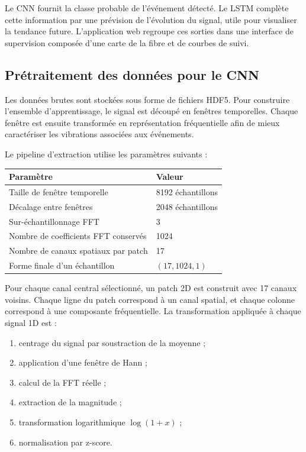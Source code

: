 \documentclass[10pt,a4paper]{article}
\begin{document}
Le CNN fournit la classe probable de l'événement détecté. Le LSTM complète cette information par une
prévision de l'évolution du signal, utile pour visualiser la tendance future. L'application web regroupe
ces sorties dans une interface de supervision composée d'une carte de la fibre et de courbes de suivi.

\subsection{Prétraitement des données pour le CNN}

Les données brutes sont stockées sous forme de fichiers HDF5. Pour construire l'ensemble d'apprentissage,
le signal est découpé en fenêtres temporelles. Chaque fenêtre est ensuite transformée en représentation
fréquentielle afin de mieux caractériser les vibrations associées aux événements.

Le pipeline d'extraction utilise les paramètres suivants :

\begin{center}
\begin{tabular}{ll}
\toprule
\textbf{Paramètre} & \textbf{Valeur} \\
\midrule
Taille de fenêtre temporelle & 8192 échantillons \\
Décalage entre fenêtres & 2048 échantillons \\
Sur-échantillonnage FFT & 3 \\
Nombre de coefficients FFT conservés & 1024 \\
Nombre de canaux spatiaux par patch & 17 \\
Forme finale d'un échantillon & $(17, 1024, 1)$ \\
\bottomrule
\end{tabular}
\end{center}

Pour chaque canal central sélectionné, un patch 2D est construit avec 17 canaux voisins. Chaque ligne du
patch correspond à un canal spatial, et chaque colonne correspond à une composante fréquentielle. La
transformation appliquée à chaque signal 1D est :

\begin{enumerate}
    \item centrage du signal par soustraction de la moyenne ;
    \item application d'une fenêtre de Hann ;
    \item calcul de la FFT réelle ;
    \item extraction de la magnitude ;
    \item transformation logarithmique $\log(1+x)$ ;
    \item normalisation par z-score.
\end{enumerate}
\end{document}
